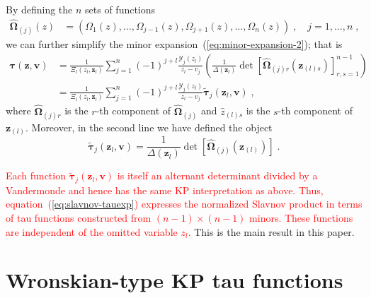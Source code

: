 \documentclass[a4paper,11pt]{amsart}
\begin{document}
By defining the \(n\) sets of functions
\begin{equation}
  \begin{split}
    \hat{\bm{\Omega}}_{(j)}(z) & = \left(\Omega_1(z), \dots, \Omega_{j-1}(z), \Omega_{j+1}(z), \dots, \Omega_n(z) \right)\; ,
    \quad j =1, \dots, n\; , 
  \end{split}
\end{equation}
we can further simplify the minor
expansion~(\ref{eq:minor-expansion-2}); that is
\begin{equation}
  \label{eq:slavnov-tauexp}
\begin{split}
  \bm{\tau}(\bm{z}, \bm{v})
  & = \frac{1}{\Xi_l(z_l, \bm{z}_l)} \sum_{j=1}^n (-1)^{j + l} \frac{\mathcal{Y}_j(z_l)}{z_l - v_j} 
    \left(\frac{1}{\Delta(\bm{z}_l)} \det[\hat{\bm{\Omega}}_{(j) r}(\bm{z}_{(l) s}) ]_{r, s=1}^{n-1}\right)\\ 
  & = \frac{1}{\Xi_l(z_l, \bm{z}_l)} \sum_{j=1}^n (-1)^{j + l} \frac{\mathcal{Y}_j(z_l)}{z_l - v_j} 
    \tilde{\bm{\tau}}_j(\bm{z}_l, \bm{v})\; ,
\end{split}
\end{equation}
where \(\hat{\bm{\Omega}}_{(j)r}\) is the \(r\)-th component of
\(\hat{\bm{\Omega}}_{(j)}\) and \(\hat{z}_{(l)s}\) is the \(s\)-th
component of \(\bm{z}_{(l)}\). Moreover, in the second line we have
defined the object
\begin{equation}
  \label{eq:basis-tau}
    \tilde{\bm{\tau}}_j(\bm{z}_l, \bm{v}) = 
\frac{1}{\Delta(\bm{z}_l)} \det[\hat{\bm{\Omega}}_{(j)}(\bm{z}_{(l)})]\; .
\end{equation}

\textcolor{red}{Each function \(\tilde{\bm{\tau}}_j(\bm{z}_l,\bm{v})\) is itself an alternant
  determinant divided by a Vandermonde and hence has the same KP interpretation as above. Thus,
  equation~(\ref{eq:slavnov-tauexp}) expresses the normalized Slavnov product in terms of tau
  functions constructed from \((n-1)\times(n-1)\) minors. These functions are independent of the
  omitted variable \(z_l\).} This is the main result in this paper.


\section{Wronskian-type KP tau functions}
\end{document}
